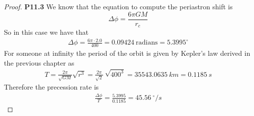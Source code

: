 \documentclass[11pt]{article}
\theoremstyle{definition}
\begin{document}
\begin{proof}{\textbf{P11.3}}
    We know that the equation to compute the periastron shift is
    $$\Delta\phi = \frac{6\pi GM}{r_c}$$
    So in this case we have that
    \begin{align*}
        \Delta\phi = \frac{6\pi \cdot 2.0}{400}
        = 0.09424~\text{radians} = 5.3995^\circ
    \end{align*}
    For someone at infinity the period of the orbit is given by Kepler's law 
    derived in the previous chapter as
    \begin{align*}
        T = \frac{2\pi}{\sqrt{GM}}\sqrt{r^3}
        = \frac{2\pi}{\sqrt{2}}~\sqrt{400^3}
        = 35543.0635~km = 0.1185~s
    \end{align*}
    Therefore the precession rate is
    \begin{align*}
        \frac{\Delta \phi}{T} = \frac{5.3995}{0.1185} = 45.56~^\circ/s 
    \end{align*}
\end{proof}
\cleardoublepage
\end{document}
